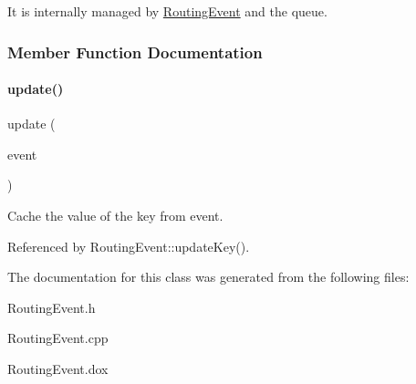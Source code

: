 It is internally managed by \mbox{\hyperlink{classKite_1_1RoutingEvent}{Routing\+Event}} and the queue. 

\subsubsection{Member Function Documentation}
\mbox{\label{classKite_1_1RoutingEvent_1_1Key_a398c66b87a5575dba86c92c7fad4a857}} 
\paragraph{\texorpdfstring{update()}{update()}}
{\footnotesize\ttfamily update (\begin{DoxyParamCaption}\item[{const \mbox{\hyperlink{classKite_1_1RoutingEvent}{Routing\+Event}} $\ast$}]{event }\end{DoxyParamCaption})}

Cache the value of the key from {\ttfamily event}. 

Referenced by Routing\+Event\+::update\+Key().



The documentation for this class was generated from the following files\+:\begin{DoxyCompactItemize}
\item 
Routing\+Event.\+h\item 
Routing\+Event.\+cpp\item 
Routing\+Event.\+dox\end{DoxyCompactItemize}
